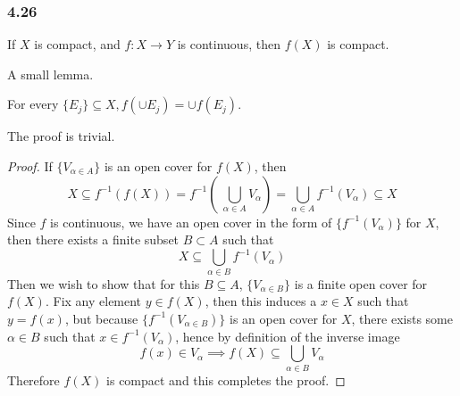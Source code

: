 \documentclass[../../main.tex]{subfiles}
\begin{document}
\subsubsection*{4.26}
\begin{wts}
If $X$ is compact, and $f:X\to Y$ is continuous, then $f(X)$ is compact.
\end{wts}
A small lemma.
\begin{lemma}
For every $\{E_j\}\subseteq X, f(\cup E_j)=\cup f(E_j)$.
\end{lemma}
The proof is trivial.

\begin{proof}
If $\{V_{\alpha\in A}\}$ is an open cover for $f(X)$, then 
\[
X\subseteq f^{-1}(f(X))=f^{-1}\left(\:\bigcup_{\alpha\in A} V_\alpha\right) = \bigcup_{\alpha\in A}f^{-1}(V_\alpha)\subseteq X
\]
Since $f$ is continuous, we have an open cover in the form of $\{f^{-1}(V_\alpha)\}$ for $X$, then there exists a finite subset $B\subset A$ such that
\[
X\subseteq\bigcup_{\alpha\in B}f^{-1}(V_\alpha)
\]
Then we wish to show that for this $B\subseteq A$, $\{V_{\alpha\in B}\}$ is a finite open cover for $f(X)$. Fix any element $y\in f(X)$, then this induces a $x\in X$ such that $y=f(x)$, but because $\{f^{-1}(V_{\alpha\in B})\}$ is an open cover for $X$, there exists some $\alpha\in B$ such that $x\in f^{-1}(V_\alpha)$, hence by definition of the inverse image
\[
f(x)\in V_\alpha\implies f(X)\subseteq \bigcup_{\alpha\in B}V_\alpha
\]
Therefore $f(X)$ is compact and this completes the proof.
\end{proof}
\end{document}
